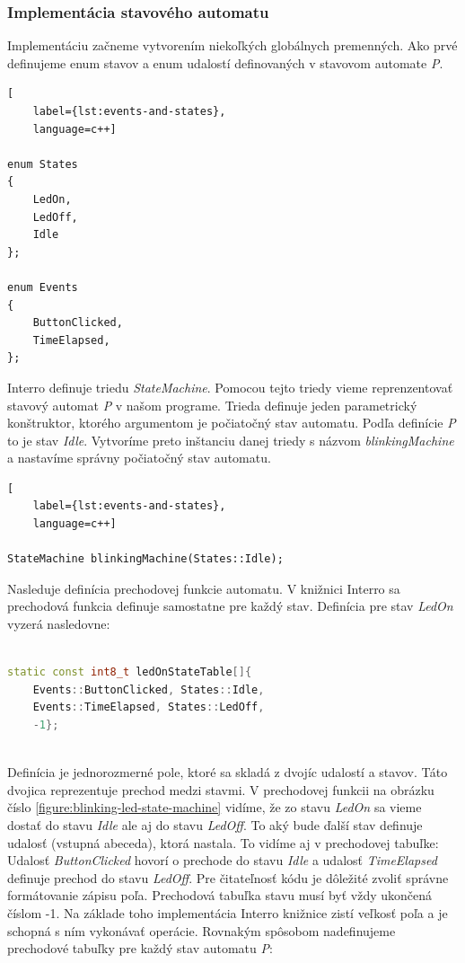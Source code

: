 \subsubsection{Implementácia stavového automatu}
Implementáciu začneme vytvorením niekoľkých globálnych premenných. Ako prvé definujeme enum stavov a enum udalostí definovaných v stavovom automate \textit{P}.
\begin{lstlisting}[
    label={lst:events-and-states},
    language=c++]  

enum States
{
    LedOn,
    LedOff,
    Idle
};

enum Events
{
    ButtonClicked,
    TimeElapsed,
};    

\end{lstlisting}
Interro definuje triedu \textit{StateMachine}. Pomocou tejto triedy vieme reprenzentovať stavový automat \textit{P} v našom programe. Trieda definuje jeden
parametrický konštruktor, ktorého argumentom je počiatočný stav automatu. Podľa definície \textit{P} to je stav \textit{Idle}. Vytvoríme preto inštanciu danej triedy s
názvom \textit{blinkingMachine} a nastavíme správny počiatočný stav automatu.
\begin{lstlisting}[
    label={lst:events-and-states},
    language=c++]  

StateMachine blinkingMachine(States::Idle);

\end{lstlisting}

Nasleduje definícia prechodovej funkcie automatu. V knižnici Interro sa prechodová funkcia definuje samostatne pre každý stav.
Definícia pre stav \textit{LedOn} vyzerá nasledovne:

\begin{lstlisting}[language=c++]  

static const int8_t ledOnStateTable[]{
    Events::ButtonClicked, States::Idle,
    Events::TimeElapsed, States::LedOff,
    -1};
    
\end{lstlisting}

Definícia je jednorozmerné pole, ktoré sa skladá z dvojíc udalostí a stavov. Táto dvojica reprezentuje prechod medzi stavmi. V prechodovej funkcii na obrázku číslo
\ref{figure:blinking-led-state-machine} vidíme, že zo stavu \textit{LedOn} sa vieme dostať do stavu \textit{Idle} ale aj do stavu \textit{LedOff}.
To aký bude ďalší stav definuje udalosť (vstupná abeceda), ktorá nastala. To vidíme aj v prechodovej tabuľke: Udalosť \textit{ButtonClicked} hovorí o prechode do stavu
\textit{Idle} a udalosť \textit{TimeElapsed} definuje prechod do stavu \textit{LedOff}. Pre čitateľnosť kódu je dôležité zvoliť správne formátovanie zápisu poľa.
Prechodová tabuľka stavu musí byť vždy ukončená číslom -1. Na základe toho implementácia Interro knižnice zistí veľkosť poľa a je schopná s ním vykonávať operácie.
Rovnakým spôsobom nadefinujeme prechodové tabuľky pre každý stav automatu \textit{P}:

